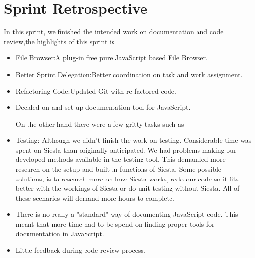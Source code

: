\section{Sprint Retrospective} %
\label{sec:Sprint Retrospective}

In this sprint, we finished the intended work on documentation and code review,the highlights of this sprint is

\begin{itemize}
\item File Browser:A plug-in free pure JavaScript based File Browser.

\item Better Sprint Delegation:Better coordination on task and work assignment.

\item Refactoring Code:Updated Git with re-factored code.

\item Decided on and set up documentation tool for JavaScript.

On the other hand there were a few gritty tasks such as

\item Testing: Although we didn't finish the work on testing. Considerable time was spent on Siesta than originally anticipated. 
	 We had problems making our developed methods available in the testing tool. This demanded more research on the setup and built-in functions of Siesta. Some possible solutions, is to research more on how Siesta works, redo our code so it 
	 fits better with the workings of Siesta or do unit testing without Siesta. All of these scenarios will demand more hours to complete.

\item There is no really a "standard" way of documenting JavaScript code. This meant that more time had to be spend on finding proper tools for documentation in JavaScript.

\item Little feedback during code review process.

\end{itemize}
